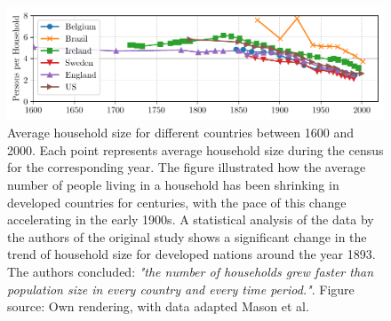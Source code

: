 \documentclass{article}
\begin{document}
\begin{figure}[ht!]
    \includegraphics[width=\textwidth]{./figures/household_size.pdf}
    \vspace{-5mm}
    \caption{
        Average household size for different countries between 1600 and 2000. Each point represents average household size during the census for the corresponding year. The figure illustrated how the average number of people living in a household has been shrinking in developed countries for centuries, with the pace of this change accelerating in the early 1900s. A statistical analysis of the data by the authors of the original study shows 
        a significant change in the trend of household size for developed nations around the year 1893. The authors concluded: \textit{"the number of households grew faster than population size in every country and every time period."}. Figure source: Own rendering, with data adapted Mason et al. \cite[Figure 2]{bradbury_long-term_2014}
    }
    \label{fig:households}
\end{figure}
\end{document}

